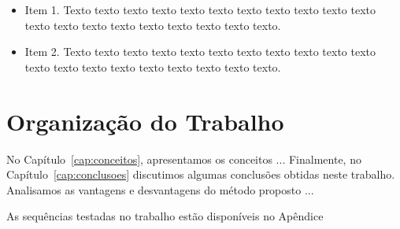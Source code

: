 \begin{itemize}
  \item Item 1. Texto texto texto texto texto texto texto texto texto texto
  texto texto texto texto texto texto texto texto texto texto.

  \item Item 2. Texto texto texto texto texto texto texto texto texto texto
  texto texto texto texto texto texto texto texto texto texto.

\end{itemize}

\section{Organização do Trabalho}
\label{sec:organizacao_trabalho}

No Capítulo~\ref{cap:conceitos}, apresentamos os conceitos ... Finalmente, no
Capítulo~\ref{cap:conclusoes} discutimos algumas conclusões obtidas neste
trabalho. Analisamos as vantagens e desvantagens do método proposto ...

As sequências testadas no trabalho estão disponíveis no Apêndice
